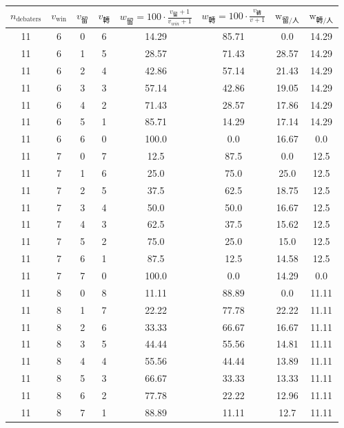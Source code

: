 \documentclass[9pt]{article}
\begin{document}
\begin{table}[h]
    \centering
    \small
    \begin{threeparttable}
    \begin{tabular}{cccccccc}
    \toprule    \toprule
    $n_{\text{debaters}}$ & $v_{\text{win}}$ & $v_{\text{留}}$ & $v_{\text{轉}}$ & $w_{\text{留}} = 100 \cdot \frac{v_{\text{留}}+1}{v_{win}+1} $ & $w_{\text{轉}} = 100\cdot\frac{v_{\text{轉}}}{v+1}$ & $\text{w}_{\text{留}/\text{人} }$ & $\text{w}_{\text{轉}/\text{人}}$ \\
    \midrule
11 & 6 & 0 & 6 & 14.29 & 85.71 & 0.0 & 14.29 \\
11 & 6 & 1 & 5 & 28.57 & 71.43 & 28.57 & 14.29 \\
11 & 6 & 2 & 4 & 42.86 & 57.14 & 21.43 & 14.29 \\
11 & 6 & 3 & 3 & 57.14 & 42.86 & 19.05 & 14.29 \\
11 & 6 & 4 & 2 & 71.43 & 28.57 & 17.86 & 14.29 \\
11 & 6 & 5 & 1 & 85.71 & 14.29 & 17.14 & 14.29 \\
11 & 6 & 6 & 0 & 100.0 & 0.0 & 16.67 & 0.0 \\
11 & 7 & 0 & 7 & 12.5 & 87.5 & 0.0 & 12.5 \\
11 & 7 & 1 & 6 & 25.0 & 75.0 & 25.0 & 12.5 \\
11 & 7 & 2 & 5 & 37.5 & 62.5 & 18.75 & 12.5 \\
11 & 7 & 3 & 4 & 50.0 & 50.0 & 16.67 & 12.5 \\
11 & 7 & 4 & 3 & 62.5 & 37.5 & 15.62 & 12.5 \\
11 & 7 & 5 & 2 & 75.0 & 25.0 & 15.0 & 12.5 \\
11 & 7 & 6 & 1 & 87.5 & 12.5 & 14.58 & 12.5 \\
11 & 7 & 7 & 0 & 100.0 & 0.0 & 14.29 & 0.0 \\
11 & 8 & 0 & 8 & 11.11 & 88.89 & 0.0 & 11.11 \\
11 & 8 & 1 & 7 & 22.22 & 77.78 & 22.22 & 11.11 \\
11 & 8 & 2 & 6 & 33.33 & 66.67 & 16.67 & 11.11 \\
11 & 8 & 3 & 5 & 44.44 & 55.56 & 14.81 & 11.11 \\
11 & 8 & 4 & 4 & 55.56 & 44.44 & 13.89 & 11.11 \\
11 & 8 & 5 & 3 & 66.67 & 33.33 & 13.33 & 11.11 \\
11 & 8 & 6 & 2 & 77.78 & 22.22 & 12.96 & 11.11 \\
11 & 8 & 7 & 1 & 88.89 & 11.11 & 12.7 & 11.11 \\

\end{tabular}
\end{threeparttable}
\end{table}
\end{document}
